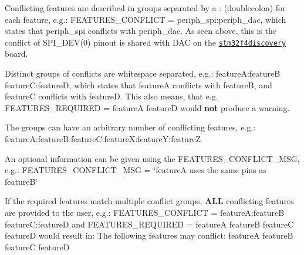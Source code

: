\begin{DoxyItemize}
\item Conflicting features are described in groups separated by a {\ttfamily \+:} (doublecolon) for each feature, e.\+g.\+: {\ttfamily F\+E\+A\+T\+U\+R\+E\+S\+\_\+\+C\+O\+N\+F\+L\+I\+CT = periph\+\_\+spi\+:periph\+\_\+dac}, which states that {\ttfamily periph\+\_\+spi} conflicts with {\ttfamily periph\+\_\+dac}. As seen above, this is the conflict of {\ttfamily S\+P\+I\+\_\+\+D\+E\+V(0)} pinout is shared with {\ttfamily D\+AC} on the \href{https://github.com/RIOT-OS/RIOT/wiki/Board%3A-STM32F4discovery}{\tt stm32f4discovery} board.
\item Distinct groups of conflicts are whitespace separated, e.\+g.\+: {\ttfamily featureA\+:featureB featureC\+:featureD}, which states that {\ttfamily featureA} conflicts with {\ttfamily featureB}, and {\ttfamily featureC} conflicts with {\ttfamily featureD}. This also means, that e.\+g. {\ttfamily F\+E\+A\+T\+U\+R\+E\+S\+\_\+\+R\+E\+Q\+U\+I\+R\+ED = featureA featureD} would {\bfseries not} produce a warning.
\item The groups can have an arbitrary number of conflicting features, e.\+g.\+: {\ttfamily feature\+A\+:feature\+B\+:feature\+C\+:feature\+X\+:featureY\+:featureZ}
\item An optional information can be given using the {\ttfamily F\+E\+A\+T\+U\+R\+E\+S\+\_\+\+C\+O\+N\+F\+L\+I\+C\+T\+\_\+\+M\+SG}, e.\+g.\+: {\ttfamily F\+E\+A\+T\+U\+R\+E\+S\+\_\+\+C\+O\+N\+F\+L\+I\+C\+T\+\_\+\+M\+SG = \char`\"{}feature\+A uses the same pins as feature\+B\char`\"{}}
\item If the required features match multiple conflict groups, {\bfseries A\+LL} conflicting features are provided to the user, e.\+g.\+: {\ttfamily F\+E\+A\+T\+U\+R\+E\+S\+\_\+\+C\+O\+N\+F\+L\+I\+CT = featureA\+:featureB featureC\+:featureD} and {\ttfamily F\+E\+A\+T\+U\+R\+E\+S\+\_\+\+R\+E\+Q\+U\+I\+R\+ED = featureA featureB featureC featureD} would result in\+: {\ttfamily The following features may conflict\+: featureA featureB featureC featureD} 
\end{DoxyItemize}